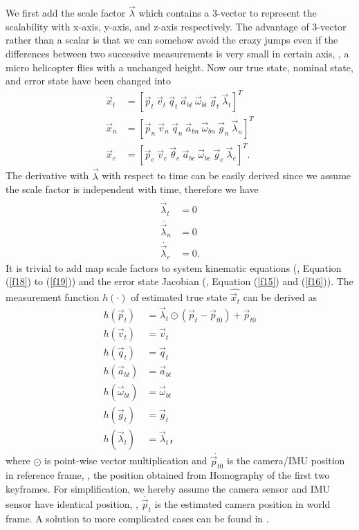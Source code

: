We first add the scale factor $\vec{\lambda}$ which contains a 3-vector to represent the scalability with x-axis, y-axis, and z-axis respectively. The advantage of 3-vector rather than a scalar is that we can somehow avoid the crazy jumps even if the differences between two successive measurements is very small in certain axis, \ie, a micro helicopter flies with a unchanged height. Now our true state, nominal state, and error state have been changed into
\begin{align}
	\vec{x}_t &= \left[ \vec{p}_t \ \vec{v}_t \ \vec{q}_t \ \vec{a}_{bt} \ \vec{\omega}_{bt} \ \vec{g}_{t} \ \vec{\lambda}_{t} \right]^T \\
	\vec{x}_n &= \left[ \vec{p}_n \ \vec{v}_n \ \vec{q}_n \ \vec{a}_{bn} \ \vec{\omega}_{bn} \ \vec{g}_{n} \ \vec{\lambda}_{n} \right]^T \\
	\vec{x}_e &= \left[ \vec{p}_e \ \vec{v}_e \ \vec{\theta}_e \ \vec{a}_{be} \ \vec{\omega}_{be} \ \vec{g}_{e} \ \vec{\lambda}_{e} \right]^T .
\end{align}
The derivative with $\vec{\lambda}$ with respect to time can be easily derived since we assume the scale factor is independent with time, therefore we have
\begin{align}
	\dot{\vec{\lambda}_t} &= 0 \\
	\dot{\vec{\lambda}_n} &= 0 \\
	\dot{\vec{\lambda}_e} &= 0.
\end{align}
It is trivial to add map scale factors to system kinematic equations (\eg, Equation (\ref{f18}) to (\ref{f19})) and the error state Jacobian (\eg, Equation (\ref{f15}) and (\ref{f16})). The measurement function $h(\cdot)$ of estimated true state $\hat{\vec{x}_t}$ can be derived as
\begin{align}
	\label{f23}
	h(\vec{p}_t) &= \vec{\lambda}_t \odot (\vec{p}_t - \vec{p}_{t0}) + \vec{p}_{t0}\\
	\label{f24}
	h(\vec{v}_t) &= \vec{v}_t\\
	\label{f25}
	h(\vec{q}_t) &= \vec{q}_t\\
	\label{f26}
	h(\vec{a}_{bt}) &= \vec{a}_{bt} \\
	\label{f27}
	h(\vec{\omega}_{bt}) &= \vec{\omega}_{bt} \\ 
	\label{f28}
	h(\vec{g}_t) &= \vec{g}_t \\
	\label{f29}
	h(\vec{\lambda}_t) &= \vec{\lambda}_t，
\end{align}
where $\odot$ is point-wise vector multiplication and $\dot{\vec{p}_{t0}}$ is the camera/IMU position in reference frame, \ie, the position obtained from Homography of the first two keyframes. For simplification, we hereby assume the camera sensor and IMU sensor have identical position, \ie, $\dot{\vec{p}_t}$ is the estimated camera position in world frame. A solution to more complicated cases can be found in \cite{lynen2013robust}.

